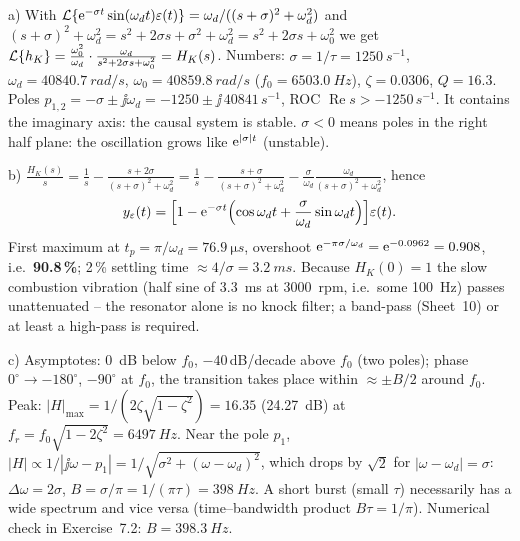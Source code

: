 \begin{solution}
a) With $\mathcal{L}\{\mathrm{e}^{-\sigma t}\sin(\omega_d t)\varepsilon(t)\}=\omega_d/((s+\sigma)^2+\omega_d^2)$
and $(s+\sigma)^2+\omega_d^2=s^2+2\sigma s+\sigma^2+\omega_d^2=s^2+2\sigma s+\omega_0^2$
we get $\mathcal{L}\{h_K\}=\frac{\omega_0^2}{\omega_d}\cdot\frac{\omega_d}{s^2+2\sigma s+\omega_0^2}=H_K(s)$.
Numbers: $\sigma=1/\tau=\SI{1250}{s^{-1}}$, $\omega_d=\SI{40840.7}{rad/s}$,
$\omega_0=\SI{40859.8}{rad/s}$ ($f_0=\SI{6503.0}{Hz}$), $\zeta=0.0306$, $Q=16.3$.
Poles $p_{1,2}=-\sigma\pm\jj\omega_d=-1250\pm\jj\,40841\,\si{s^{-1}}$,
ROC $\operatorname{Re}s>-1250\,\si{s^{-1}}$. It contains the imaginary axis:
the causal system is stable. $\sigma<0$ means poles in the right half plane:
the oscillation grows like $\mathrm{e}^{|\sigma|t}$ (unstable).

b) $\frac{H_K(s)}{s}=\frac1s-\frac{s+2\sigma}{(s+\sigma)^2+\omega_d^2}
=\frac1s-\frac{s+\sigma}{(s+\sigma)^2+\omega_d^2}-\frac{\sigma}{\omega_d}\frac{\omega_d}{(s+\sigma)^2+\omega_d^2}$, hence
\[ y_\varepsilon(t)=\Bigl[1-\mathrm{e}^{-\sigma t}\Bigl(\cos\omega_d t+\frac{\sigma}{\omega_d}\sin\omega_d t\Bigr)\Bigr]\varepsilon(t). \]
First maximum at $t_p=\pi/\omega_d=\SI{76.9}{\micro s}$, overshoot
$\mathrm{e}^{-\pi\sigma/\omega_d}=\mathrm{e}^{-0.0962}=0.908$, i.e.\ \textbf{90.8\,\%};
2\,\% settling time $\approx 4/\sigma=\SI{3.2}{ms}$. Because $H_K(0)=1$ the slow
combustion vibration (half sine of \SI{3.3}{ms} at \SI{3000}{rpm}, i.e.\ some
\SI{100}{Hz}) passes unattenuated -- the resonator alone is no knock filter; a
band-pass (Sheet~10) or at least a high-pass is required.

c) Asymptotes: \SI{0}{dB} below $f_0$, $-40$\,dB/decade above $f_0$ (two poles);
phase $0^\circ\to-180^\circ$, $-90^\circ$ at $f_0$, the transition takes place
within $\approx\pm B/2$ around $f_0$. Peak: $|H|_{\max}=1/(2\zeta\sqrt{1-\zeta^2})=16.35$
(\SI{24.27}{dB}) at $f_r=f_0\sqrt{1-2\zeta^2}=\SI{6497}{Hz}$. Near the pole
$p_1$, $|H|\propto1/|\jj\omega-p_1|=1/\sqrt{\sigma^2+(\omega-\omega_d)^2}$, which
drops by $\sqrt2$ for $|\omega-\omega_d|=\sigma$: $\Delta\omega=2\sigma$,
$B=\sigma/\pi=1/(\pi\tau)=\SI{398}{Hz}$. A short burst (small $\tau$)
necessarily has a wide spectrum and vice versa (time--bandwidth product
$B\tau=1/\pi$). Numerical check in Exercise~7.2: $B=\SI{398.3}{Hz}$.
\begin{center}
\end{center}


\end{solution}
